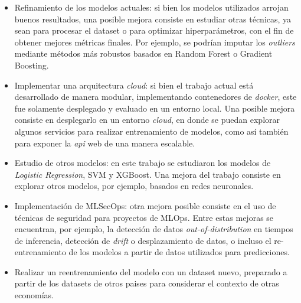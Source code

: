 \begin{itemize}
    \item Refinamiento de los modelos actuales: si bien los modelos utilizados arrojan buenos resultados, una posible mejora consiste en estudiar otras técnicas, ya sean para procesar el dataset o para optimizar hiperparámetros, con el fin de obtener mejores métricas finales. Por ejemplo, se podrían imputar los \textit{outliers} mediante métodos más robustos basados en Random Forest o Gradient Boosting.
    \item Implementar una arquitectura \textit{cloud}: si bien el trabajo actual está desarrollado de manera modular, implementando contenedores de \textit{docker}, este fue solamente desplegado y evaluado en un entorno local. Una posible mejora consiste en desplegarlo en un entorno \textit{cloud}, en donde se puedan explorar algunos servicios para realizar entrenamiento de modelos, como así también para exponer la \textit{api} web de una manera escalable.
    \item Estudio de otros modelos: en este trabajo se estudiaron los modelos de \textit{Logistic Regression}, SVM y XGBoost. Una mejora del trabajo consiste en explorar otros modelos, por ejemplo, basados en redes neuronales.
    \item Implementación de MLSecOps: otra mejora posible consiste en el uso de técnicas de seguridad para proyectos de MLOps. Entre estas mejoras se encuentran, por ejemplo, la detección de datos \textit{out-of-distribution} en tiempos de inferencia, detección de \textit{drift} o desplazamiento de datos, o incluso el re-entrenamiento de los modelos a partir de datos utilizados para predicciones.
    \item Realizar un reentrenamiento del modelo con un dataset nuevo, preparado a partir de los datasets de otros paises para considerar el contexto de otras economías.
\end{itemize}